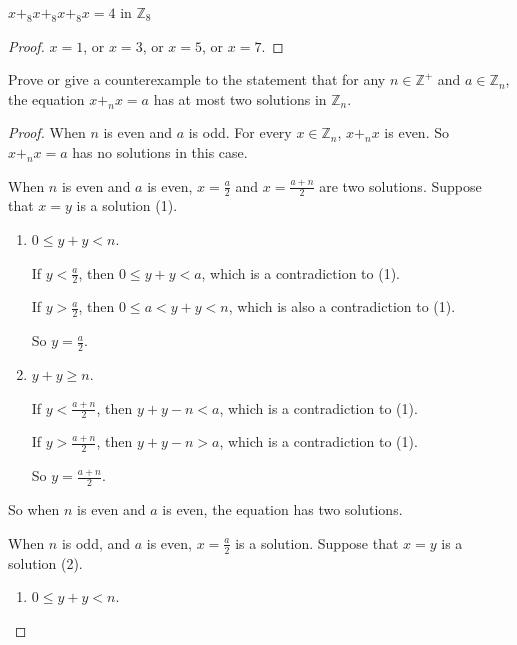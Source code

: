 \begin{exercise}
    $x {+}_{8} x {+}_{8} x {+}_{8} x = 4$ in $\mathbb{Z}_{8}$
\end{exercise}

\begin{proof}
    $x = 1$, or $x = 3$, or $x = 5$, or $x = 7$.
\end{proof}

\begin{exercise}
    Prove or give a counterexample to the statement that for any $n\in\mathbb{Z}^{+}$ and $a\in\mathbb{Z}_{n}$, the equation $x {+}_{n} x = a$ has at most two solutions in $\mathbb{Z}_{n}$.
\end{exercise}

\begin{proof}
    When $n$ is even and $a$ is odd. For every $x\in\mathbb{Z}_{n}$, $x {+}_{n} x$ is even. So $x {+}_{n} x = a$ has no solutions in this case.

    When $n$ is even and $a$ is even, $x = \frac{a}{2}$ and $x = \frac{a + n}{2}$ are two solutions. Suppose that $x = y$ is a solution (1).
    \begin{enumerate}[label={\textbf{Case \arabic*.}},itemindent=1cm]
        \item $0\le y + y < n$.

              If $y < \frac{a}{2}$, then $0\le y + y < a$, which is a contradiction to (1).

              If $y > \frac{a}{2}$, then $0\le a < y + y < n$, which is also a contradiction to (1).

              So $y = \frac{a}{2}$.
        \item $y + y \ge n$.

              If $y < \frac{a + n}{2}$, then $y + y - n < a$, which is a contradiction to (1).

              If $y > \frac{a + n}{2}$, then $y + y - n > a$, which is a contradiction to (1).

              So $y = \frac{a + n}{2}$.
    \end{enumerate}

    So when $n$ is even and $a$ is even, the equation has two solutions.

    When $n$ is odd, and $a$ is even, $x = \frac{a}{2}$ is a solution. Suppose that $x = y$ is a solution (2).
    \begin{enumerate}[label={\textbf{Case \arabic*}},itemindent=1cm]
        \item $0\le y + y < n$.


\end{enumerate}
\end{proof}
